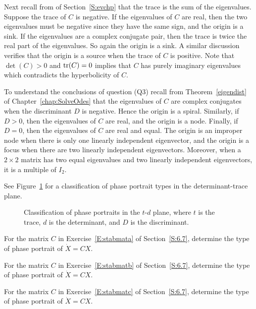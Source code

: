 \documentclass{ximera}
\begin{document}
Next recall from  of Section~\ref{S:evchp} that the trace is 
the sum of the 
eigenvalues. Suppose the trace of $C$ is negative.  If the eigenvalues
of $C$ are real, then the two eigenvalues must be negative since they
have the same sign, and the origin is a sink.  If the eigenvalues are
a complex conjugate pair, then the trace is twice the real part of the
eigenvalues.  So again the origin is a sink.  A similar discussion
verifies that the origin is a source when the trace of $C$ is positive.
Note that $\det(C)>0$ and ${\rm tr}(C)= 0$ implies that $C$ has purely
imaginary eigenvalues which contradicts the hyperbolicity of $C$.

To understand the conclusions of question (Q3) recall from
Theorem~\ref{eigendist} of Chapter~\ref{chap:SolveOdes} that the 
eigenvalues of $C$ are complex
conjugates when the discriminant $D$ is negative. Hence the origin is
a spiral.  Similarly, if $D>0$, then the eigenvalues of $C$ are real,
and the origin is a node.  Finally, if $D=0$, then the eigenvalues of
$C$ are real and equal.  The origin is an improper node when there is
only one linearly independent eigenvector, and the origin is a focus
when there are two linearly independent eigenvectors.  Moreover, when
a $2\times 2$ matrix has two equal eigenvalues and two linearly
independent eigenvectors, it is a multiple of $I_2$.

See Figure~\ref{F:td} for a classification of phase portrait types
in the determinant-trace plane.

\begin{figure}[htb]
           \centerline{%
           }
           \caption{Classification of phase portraits in the
		$t$-$d$ plane, where $t$ is the trace, $d$ is the
	determinant, and $D$ is the discriminant.}
           \label{F:td}
\end{figure}

\EXER

\TEXER

\begin{exercise} \label{c6.8.1a}
For the matrix $C$ in Exercise~\ref{E:stabmata} of Section~\ref{S:6.7},
determine the type of phase portrait of $\dot{X}=CX$.
\end{exercise}
\begin{exercise} \label{c6.8.1b}
For the matrix $C$ in Exercise~\ref{E:stabmatb} of Section~\ref{S:6.7}, 
determine the type of phase portrait of $\dot{X}=CX$.
\end{exercise}
\begin{exercise} \label{c6.8.1c}
For the matrix $C$ in Exercise~\ref{E:stabmatc}  of Section~\ref{S:6.7},
determine the type of phase portrait of $\dot{X}=CX$.
\end{exercise}
\end{document}
